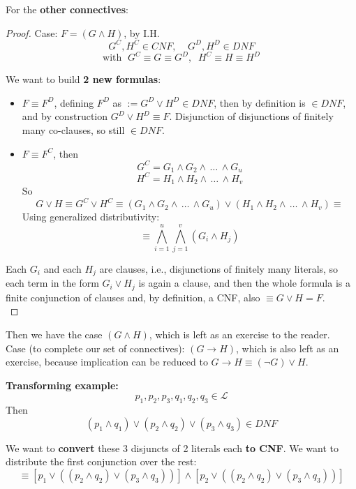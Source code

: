 	For the \textbf{other connectives}: \begin{proof}
		Case: $F = (G \wedge H)$, by I.H.
		$$  G^C, H^C \in CNF, \;\;\;\; G^D, H^D \in DNF $$
		$$ \text{with } \; G^C \equiv G \equiv G^D, \;\; H^C \equiv H \equiv H^D $$

		We want to build \textbf{2 new formulas}:
		\begin{itemize}
			\item $F \equiv F^D$, defining $F^D$ as  $:= G^D \vee H^D \in DNF$, then by definition is $ \in DNF$, and by construction $G^D \vee H^D \equiv F$. Disjunction of disjunctions of finitely many co-clauses, so still $\in DNF$.\\

			\item $F \equiv F^C$, then
			$$ G^C = G_1 \wedge G_2 \wedge \, \dots \, \wedge G_u $$
			$$ H^C = H_1 \wedge H_2 \wedge \, \dots \, \wedge H_v $$
			So
			$$ G \vee H \equiv G^C \vee H^C \equiv (G_1 \wedge G_2 \wedge \, \dots \, \wedge G_u) \vee (H_1 \wedge H_2 \wedge \, \dots \, \wedge H_v) \equiv $$
			Using generalized distributivity:
			$$ \equiv \bigwedge_{i=1}^u \bigwedge_{j=1}^v (G_i \wedge H_j) $$
		\end{itemize}


		Each $G_i$ and each $H_j$ are clauses, i.e., disjunctions of finitely many literals, so each term in the form $G_i \vee H_j$ is again a clause, and then the whole formula is a finite conjunction of clauses and, by definition, a CNF, also $\equiv G \vee H = F$.\\
	\end{proof}

	Then we have the case $(G \wedge H)$, which is left as an exercise to the reader.\\

	Case (to complete our set of connectives): $(G \rightarrow H)$, which is also left as an exercise, because implication can be reduced to $G \rightarrow H \equiv (\neg G) \vee H$.\\

	\newpage

	\textbf{Transforming example:}
	$$ p_1, p_2, p_3, q_1, q_2, q_3 \in \mathcal{L}$$
	Then
	$$ (p_1 \wedge q_1) \vee (p_2 \wedge q_2) \vee (p_3 \wedge q_3) \in DNF$$

	We want to \textbf{convert} these 3 disjuncts of 2 literals each \textbf{to CNF}. We want to distribute the first conjunction over the rest:
	$$ \equiv [p_1 \vee ((p_2 \wedge q_2) \vee (p_3 \wedge q_3))] \wedge [p_2 \vee ((p_2 \wedge q_2) \vee (p_3 \wedge q_3))] $$

